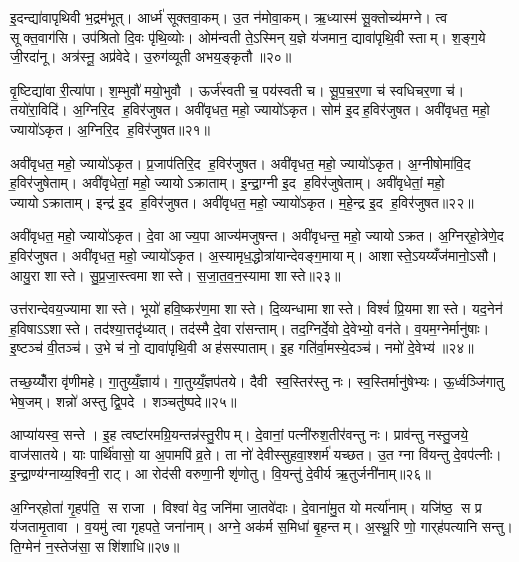 इ॒दन्द्या॑वापृथिवी भ॒द्रम॑भूत्। आर्ध्म॑ सूक्तवा॒कम्। उ॒त न॑मोवा॒कम्। ऋ॒ध्यास्म॑ सू॒क्तोच्य॑मग्ने। त्व सूक्त॒वाग॑सि। उप॑श्रितो दि॒वः पृ॑थि॒व्योः। ओम॑न्वती ते॒ऽस्मिन् य॒ज्ञे य॑जमान॒ द्यावा॑पृथि॒वी स्ताम्। श॒ङ्ग॒ये जी॒रदा॑नू। अत्र॑स्नू॒ अप्र॑वेदे। उ॒रुग॑व्यूती अभय॒ङ्कृतौ॥२०॥

वृ॒ष्टिद्या॑वा री॒त्या॑पा। श॒म्भुवौ॑ मयो॒भुवौ। ऊर्ज॑स्वती च॒ पय॑स्वती च। सू॒प॒च॒र॒णा च॑ स्वधिचर॒णा च॑। तयो॑रा॒विदि॑। अ॒ग्निरि॒द ह॒विर॑जुषत। अवी॑वृधत॒ महो॒ ज्यायो॑ऽकृत। सोम॑ इ॒दह॒विर॑जुषत। अवी॑वृधत॒ महो॒ ज्यायो॑ऽकृत। अ॒ग्निरि॒द ह॒विर॑जुषत॥२१॥

अवी॑वृधत॒ महो॒ ज्यायो॑ऽकृत। प्र॒जाप॑तिरि॒द ह॒विर॑जुषत। अवी॑वृधत॒ महो॒ ज्यायो॑ऽकृत। अ॒ग्नीषोमा॑वि॒द ह॒विर॑जुषेताम्। अवी॑वृधेतां॒ महो॒ ज्यायोऽक्राताम्। इ॒न्द्रा॒ग्नी इ॒द ह॒विर॑जुषेताम्। अवी॑वृधेतां॒ महो॒ ज्यायोऽक्राताम्। इन्द्र॑ इ॒द ह॒विर॑जुषत। अवी॑वृधत॒ महो॒ ज्यायो॑ऽकृत। म॒हे॒न्द्र इ॒द ह॒विर॑जुषत॥२२॥

अवी॑वृधत॒ महो॒ ज्यायो॑ऽकृत। दे॒वा आज्य॒पा आज्य॑मजुषन्त। अवी॑वृधन्त॒ महो॒ ज्यायोऽक्रत। अ॒ग्निर्‌हो॒त्रेणे॒द ह॒विर॑जुषत। अवी॑वृधत॒ महो॒ ज्यायो॑ऽकृत। अ॒स्यामृध॒द्धोत्रा॑यान्देवङ्ग॒मायाम्। आशास्ते॒ऽयय्यँज॑मानो॒ऽसौ। आयु॒रा शास्ते। सु॒प्र॒जा॒स्त्वमा शास्ते। स॒जा॒त॒व॒न॒स्यामा शास्ते॥२३॥

उत्त॑रान्देवय॒ज्यामा शास्ते। भूयो॑ हवि॒ष्कर॑ण॒मा शास्ते। दि॒व्यन्धामा शास्ते। विश्वं॑ प्रि॒यमा शास्ते। यद॒नेन॑ ह॒विषाऽऽशास्ते। तद॑श्या॒त्तदृ॑ध्यात्। तद॑स्मै दे॒वा रा॑सन्ताम्। तद॒ग्निर्दे॒वो दे॒वेभ्यो॒ वन॑ते। व॒यम॒ग्नेर्मानु॑षाः। इ॒ष्टञ्च॑ वी॒तञ्च॑। उ॒भे च॑ नो॒ द्यावा॑पृथि॒वी अह॑सस्पाताम्। इ॒ह गति॑र्वा॒मस्ये॒दञ्च॑। नमो॑ दे॒वेभ्य॑॥२४॥\anuvakamend[अ॒भ॒य॒ङ्कृता॑वकृता॒ग्निरि॒द ह॒विर॑जुषत महे॒न्द्र इ॒द ह॒विर॑जुषत सजातवन॒स्यामा शास्ते वी॒तञ्च॒ त्रीणि॑ च]

तच्छ॒य्योँरा वृ॑णीमहे। गा॒तुय्यँ॒ज्ञाय॑। गा॒तुय्यँ॒ज्ञप॑तये। दैवी स्व॒स्तिर॑स्तु नः। स्व॒स्तिर्मानु॑षेभ्यः। ऊ॒र्ध्वञ्जि॑गातु भेष॒जम्। शन्नो॑ अस्तु द्वि॒पदे। शञ्चतु॑ष्पदे॥२५॥\anuvakamend[तच्छ॒य्योँर॒ष्टौ]

आप्या॑यस्व॒ सन्ते। इ॒ह त्वष्टा॑रमग्रि॒यन्तन्न॑स्तु॒रीपम्। दे॒वानां॒ पत्नी॑रुश॒तीर॑वन्तु नः। प्राव॑न्तु नस्तु॒जये॒ वाज॑सातये। याः पार्थि॑वासो॒ या अ॒पामपि॑ व्र॒ते। ता नो॑ देवीस्सुहवा॒श्शर्म॑ यच्छत। उ॒त ग्ना वि॑यन्तु दे॒वप॑त्नीः। इ॒न्द्रा॒ण्य॑ग्नाय्य॒श्विनी॒ राट्। आ रोद॑सी वरुणा॒नी शृ॑णोतु। वि॒यन्तु॑ दे॒वीर्य ऋ॒तुर्जनी॑नाम्॥२६॥

अ॒ग्निर्‌होता॑ गृ॒हप॑ति॒ स राजा। विश्वा॑ वेद॒ जनि॑मा जा॒तवे॑दाः। दे॒वाना॑मु॒त यो मर्त्या॑नाम्। यजि॑ष्ठ॒ स प्र य॑जतामृ॒तावा। व॒यमु॑ त्वा गृहपते॒ जना॑नाम्। अग्ने॒ अक॑र्म स॒मिधा॑ बृ॒हन्तम्। अ॒स्थू॒रि णो॒ गार्‌ह॑पत्यानि सन्तु। ति॒ग्मेन॑ न॒स्तेज॑सा॒ सशि॑शाधि॥२७॥\anuvakamend[जनी॑नाम॒ष्टौ च॑]

